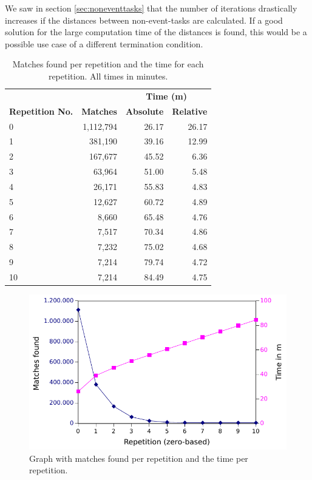 We saw in section \ref{sec:noneventtasks} that the number of iterations drastically increases if the distances between non-event-tasks are calculated.
If a good solution for the large computation time of the distances is found, this would be a possible use case of a different termination condition.

\begin{table}[h!]
		\centering
	\begin{tabular}{ l r r r }
		  \toprule
			& & \multicolumn{2}{c}{\textbf{Time (m)}} \\
			\cmidrule{3-4}
		  \textbf{Repetition No.} & \textbf{Matches} & \textbf{Absolute}& \textbf{Relative} \\
		  \midrule
     		    0  & 1,112,794 & 26.17 & 26.17\\
	            1  & 381,190   & 39.16 & 12.99\\
		    2  & 167,677   & 45.52 & 6.36\\
		    3  & 63,964    & 51.00 & 5.48\\
		    4  & 26,171    & 55.83 & 4.83\\
		    5  & 12,627    & 60.72 & 4.89\\
		    6  & 8,660     & 65.48 & 4.76\\
		    7  & 7,517     & 70.34 & 4.86\\
		    8  & 7,232     & 75.02 & 4.68\\
		    9  & 7,214     & 79.74 & 4.72\\
		    10 & 7,214     & 84.49 & 4.75\\
		  \bottomrule
		   \end{tabular}
		   \caption{Matches found per repetition and the time for each repetition. All times in minutes.}
		   \label{tab:timesandmatchesperiteration} %
	\end{table}
	\begin{figure}[h!]
		\centering
		\includegraphics[]{chapters/casestudy/hasehase.pdf}
		\caption{Graph with matches found per repetition and the time per repetition.}
		\label{fig:hasehase}
	\end{figure}


